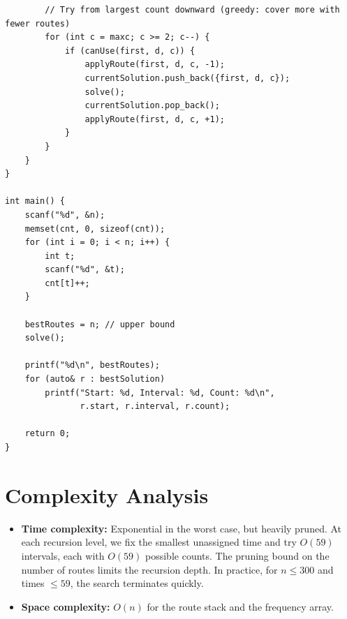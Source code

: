 \documentclass[11pt,a4paper]{article}
\begin{document}
\begin{lstlisting}
        // Try from largest count downward (greedy: cover more with fewer routes)
        for (int c = maxc; c >= 2; c--) {
            if (canUse(first, d, c)) {
                applyRoute(first, d, c, -1);
                currentSolution.push_back({first, d, c});
                solve();
                currentSolution.pop_back();
                applyRoute(first, d, c, +1);
            }
        }
    }
}

int main() {
    scanf("%d", &n);
    memset(cnt, 0, sizeof(cnt));
    for (int i = 0; i < n; i++) {
        int t;
        scanf("%d", &t);
        cnt[t]++;
    }

    bestRoutes = n; // upper bound
    solve();

    printf("%d\n", bestRoutes);
    for (auto& r : bestSolution)
        printf("Start: %d, Interval: %d, Count: %d\n",
               r.start, r.interval, r.count);

    return 0;
}
\end{lstlisting}

\section{Complexity Analysis}

\begin{itemize}
  \item \textbf{Time complexity:} Exponential in the worst case, but heavily pruned.
        At each recursion level, we fix the smallest unassigned time and try $O(59)$
        intervals, each with $O(59)$ possible counts. The pruning bound on the
        number of routes limits the recursion depth. In practice, for $n \le 300$
        and times $\le 59$, the search terminates quickly.
  \item \textbf{Space complexity:} $O(n)$ for the route stack and the frequency array.
\end{itemize}
\end{document}
